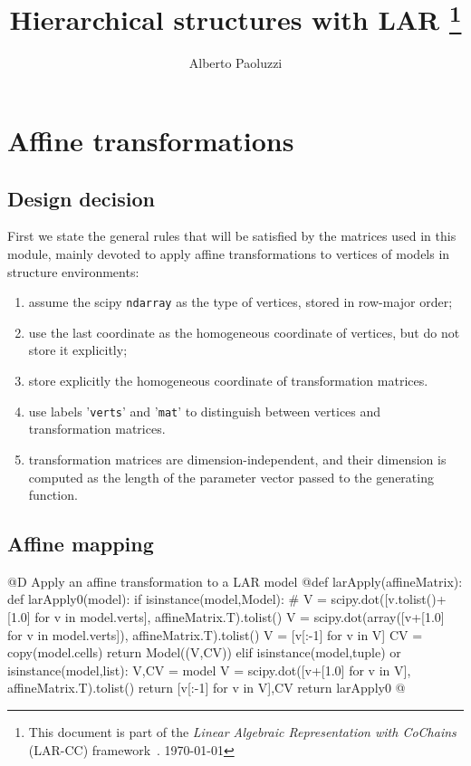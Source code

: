 \documentclass[11pt,oneside]{article}    %
\title{Hierarchical structures with LAR
\footnote{This document is part of the \emph{Linear Algebraic Representation with CoChains} (LAR-CC) framework~\cite{cclar-proj:2013:00}. \today}
}
\author{Alberto Paoluzzi}
\begin{document}
\maketitle
\nonstopmode

\tableofcontents



\section{Affine transformations}
\subsection{Design decision}
First we state the general rules that will be satisfied by the matrices used in this module, mainly devoted to apply affine transformations to vertices of models in structure environments:
\begin{enumerate}
\item assume the scipy \texttt{ndarray} as the type of vertices, stored in row-major order;
\item use the last coordinate as the homogeneous coordinate of vertices, but do not store it explicitly;
\item store explicitly the homogeneous coordinate of transformation matrices.
\item use labels '\texttt{verts}' and '\texttt{mat}' to distinguish between vertices and transformation matrices.
\item transformation matrices are dimension-independent, and their dimension is computed as the length of the parameter vector passed to the generating function.
\end{enumerate}


\subsection{Affine mapping}

@D Apply an affine transformation to a LAR model 
@{def larApply(affineMatrix):
    def larApply0(model):
        if isinstance(model,Model):
            # V = scipy.dot([v.tolist()+[1.0] for v in model.verts], affineMatrix.T).tolist()
            V = scipy.dot(array([v+[1.0] for v in model.verts]), affineMatrix.T).tolist()
            V = [v[:-1] for v in V]
            CV = copy(model.cells)
            return Model((V,CV))
        elif isinstance(model,tuple) or isinstance(model,list):
            V,CV = model
            V = scipy.dot([v+[1.0] for v in V], affineMatrix.T).tolist()
            return [v[:-1] for v in V],CV
    return larApply0
@}
\end{document}
